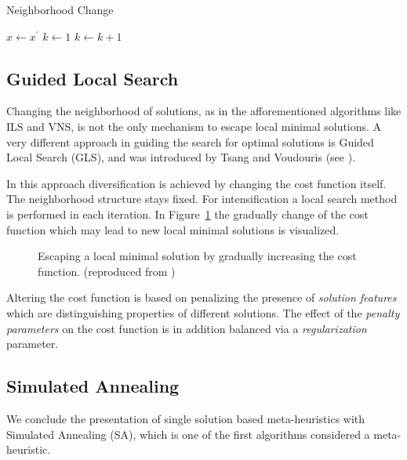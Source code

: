 \begin{algorithm}
\caption{Neighborhood Change}
\label{changealgo}
\begin{algorithmic}[1]
    \State $x\gets x^\prime$
    \State $k\gets 1$
\Else
    \State $k\gets k+1$
\EndIf

\EndFunction
\end{algorithmic}
\end{algorithm}

\subsection{Guided Local Search}
Changing the neighborhood of solutions, as in the afforementioned algorithms like ILS and VNS, is not the only mechanism to escape local minimal solutions.
A very different approach in guiding the search for optimal solutions is Guided Local Search (GLS), and was introduced by Tsang and Voudouris (see \cite{TsangVoudouris1997gls}\cite{TsangVoudouris1999gls}). 

In this approach diversification is achieved by changing the cost function itself. 
The neighborhood structure stays fixed. 
For intensification a local search method is performed in each iteration.
In Figure~\ref{fig:fig_gls} the gradually change of the cost function which may lead to new local minimal solutions is visualized. 
\begin{figure}[thb] 
   \footnotesize
   \centering
    \def\svgwidth{0.75\textwidth}
    
    \caption[Escaping a local minimal solution by gradually increasing the cost function.]{Escaping a local minimal solution by gradually increasing the cost function. (reproduced from \cite{blum2003metaheuristics})}  
     \label{fig:fig_gls}
\end{figure}

Altering the cost function is based on penalizing the presence of \emph{solution features} which are distinguishing properties of different solutions. 
The effect of the \emph{penalty parameters} on the cost function is in addition balanced via a \emph{regularization} parameter.  

\subsection{Simulated Annealing}
We conclude the presentation of single solution based meta-heuristics with Simulated Annealing (SA), which is one of the first algorithms considered a meta-heuristic. 


